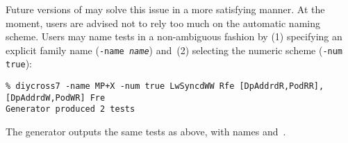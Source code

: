 Future versions of \diy{} may solve this issue in a more satisfying manner.
At the moment, users are advised not to rely too much
on the automatic naming scheme.
Users may name tests in a non-ambiguous fashion by (1) specifying
an explicit family name  (\texttt{-name \emph{name}}) and~(2)
selecting the numeric scheme (\texttt{-num true}):
\begin{verbatim}
% diycross7 -name MP+X -num true LwSyncdWW Rfe [DpAddrdR,PodRR],[DpAddrdW,PodWR] Fre
Generator produced 2 tests
\end{verbatim}
The \diycross{} generator outputs the same tests as above, with
names  and~.
\ifhevea
\begin{center}
\qquad{}
\end{center}
\fi



